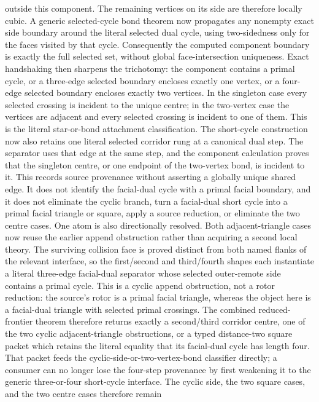 \documentclass[11pt]{article}
\theoremstyle{definition}
\begin{document}
outside this component.  The remaining vertices on its side are therefore
locally cubic.  A generic selected-cycle bond theorem now propagates any
nonempty exact side boundary around the literal selected dual cycle, using
two-sidedness only for the faces visited by that cycle.  Consequently the
computed component boundary is exactly the full selected set, without global
face-intersection uniqueness.  Exact handshaking then sharpens the trichotomy:
the component contains a primal cycle, or a three-edge selected boundary
encloses exactly one vertex, or a four-edge selected boundary encloses exactly
two vertices.  In the singleton case every selected crossing is incident to
the unique centre; in the two-vertex case the vertices are adjacent and every
selected crossing is incident to one of them.  This is the literal
star-or-bond attachment classification.  The short-cycle construction now
also retains one literal selected corridor rung at a canonical dual step.
The separator uses that edge at the same step, and the component calculation
proves that the singleton centre, or one endpoint of the two-vertex bond, is
incident to it.  This records source provenance without asserting a globally
unique shared edge.  It does not identify the facial-dual cycle with a primal
facial boundary, and it does not eliminate the cyclic
  branch, turn a facial-dual short cycle into a primal facial triangle or square,
  apply a source reduction, or eliminate the two centre cases.  One atom is also directionally
  resolved.  Both adjacent-triangle cases now reuse the earlier append
  obstruction rather than acquiring a second local theory.  The surviving
  collision face is proved distinct from both named flanks of the relevant
  interface, so the first/second and third/fourth shapes each instantiate a
  literal three-edge facial-dual separator whose selected outer-remote side
  contains a primal cycle.  This is a cyclic append obstruction, not a rotor
  reduction: the source's rotor is a primal facial triangle, whereas the
  object here is a facial-dual triangle with selected primal crossings.  The
  combined reduced-frontier theorem therefore returns exactly a second/third
  corridor centre, one of the two cyclic adjacent-triangle obstructions, or
  a typed distance-two square packet which retains the literal equality that
  its facial-dual cycle has length four.  That packet feeds the
  cyclic-side-or-two-vertex-bond classifier directly; a consumer can no
  longer lose the four-step provenance by first weakening it to the generic
  three-or-four short-cycle interface.  The
  cyclic side, the two square cases, and the two centre cases therefore remain
\end{document}
